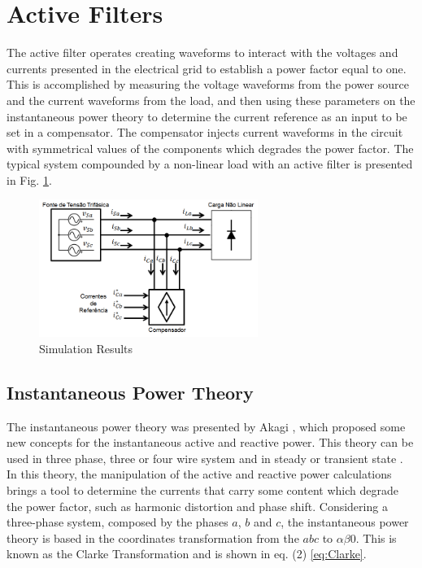 \section{Active Filters}

The active filter operates creating waveforms to interact with the voltages and currents presented in the electrical grid to establish a power factor equal to one. This is accomplished by measuring the voltage waveforms from the power source and the current waveforms from the load, and then using these parameters on the instantaneous power theory to determine the current reference as an input to be set in a compensator. The compensator injects current waveforms in the circuit with symmetrical values of the components which degrades the power factor. The typical system compounded by a non-linear load with an active filter is presented in Fig. \ref{fig:compensador.png}.

\begin{figure}[!t]
\centering
\includegraphics[width=2.8in]{Figures/compensador.png}
\caption{Simulation Results}
\label{fig:compensador.png}
\end{figure}



\subsection{Instantaneous Power Theory}

The instantaneous power theory was presented by Akagi \cite{Akagi}, which proposed some new concepts for the instantaneous active and reactive power. This theory can be used in three phase, three or four wire system and in steady or transient state \cite{Akagi,Akagi}. In this theory, the manipulation of the active and reactive power calculations brings a tool to determine the currents that carry some content which degrade the power factor, such as harmonic distortion and phase shift.
Considering a three-phase system, composed by the phases $a$, $b$ and $c$, the instantaneous power theory is based in the coordinates transformation from the $abc$ to $\alpha \beta 0 $. This is known as the Clarke Transformation and is shown in eq. (2) \ref{eq:Clarke}.


